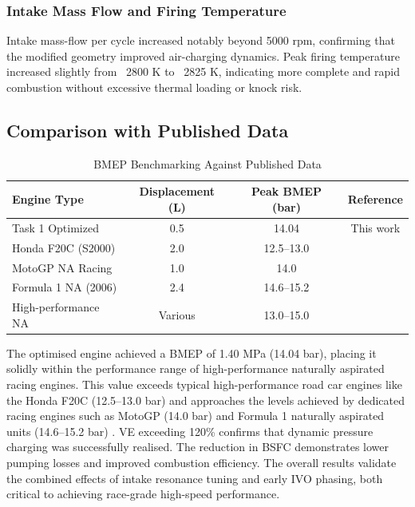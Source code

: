 \subsubsection{Intake Mass Flow and Firing Temperature}

Intake mass-flow per cycle increased notably beyond 5000 rpm, confirming that the modified geometry improved air-charging dynamics. Peak firing temperature increased slightly from ~2800 K to ~2825 K, indicating more complete and rapid combustion without excessive thermal loading or knock risk.

\subsection{Comparison with Published Data}

\begin{table}[H]
    \centering
    \caption{BMEP Benchmarking Against Published Data}
    \label{tab:task1_benchmark}
    \begin{tabular}{lccc}
        \toprule
        Engine Type & Displacement (L) & Peak BMEP (bar) & Reference \\
        \midrule
        Task 1 Optimized & 0.5 & 14.04 & This work \\
        Honda F20C (S2000) & 2.0 & 12.5--13.0 & \cite{honda_f20c} \\
        MotoGP NA Racing & 1.0 & 14.0 & \cite{blair_racehead} \\
        Formula 1 NA (2006) & 2.4 & 14.6--15.2 & \cite{nascar_tech} \\
        High-performance NA & Various & 13.0--15.0 & \cite{bmep_comparison} \\
        \bottomrule
    \end{tabular}
\end{table}

The optimised engine achieved a BMEP of 1.40 MPa (14.04 bar), placing it solidly within the performance range of high-performance naturally aspirated racing engines. This value exceeds typical high-performance road car engines like the Honda F20C (12.5--13.0 bar) and approaches the levels achieved by dedicated racing engines such as MotoGP (14.0 bar) and Formula 1 naturally aspirated units (14.6--15.2 bar) \cite{blair_racehead, nascar_tech}. VE exceeding 120\% confirms that dynamic pressure charging was successfully realised. The reduction in BSFC demonstrates lower pumping losses and improved combustion efficiency. The overall results validate the combined effects of intake resonance tuning and early IVO phasing, both critical to achieving race-grade high-speed performance.

